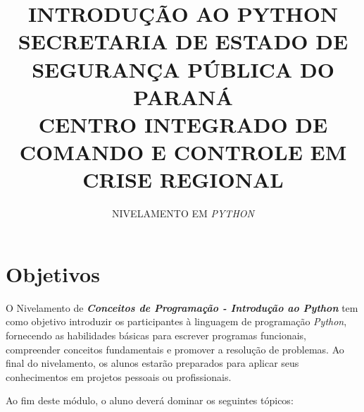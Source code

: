 \documentclass[a4paper, 12pt, onecolumn,singlespacing]{article}
\title{INTRODUÇÃO AO PYTHON\\SECRETARIA DE ESTADO DE SEGURANÇA PÚBLICA DO PARANÁ\\CENTRO INTEGRADO DE COMANDO E CONTROLE EM CRISE REGIONAL}
\author[1]{NIVELAMENTO EM \textit{PYTHON}}
\affil[1]{EQUIPE TÉCNICA CICCR}
\begin{document}
	
	\maketitle
	
	\section{Objetivos}
	\label{objetivos}
	
	O Nivelamento de \textbf{\textit{Conceitos de Programação - Introdução ao Python }}tem como objetivo introduzir os participantes à linguagem de programação \textit{Python}, fornecendo as habilidades básicas para escrever programas funcionais, compreender conceitos fundamentais e promover a resolução de problemas. Ao final do nivelamento, os alunos estarão preparados para aplicar seus conhecimentos em projetos pessoais ou profissionais.
	
	Ao fim deste módulo, o aluno deverá dominar os seguintes tópicos:
	
\end{document}
